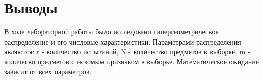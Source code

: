 \documentclass[a4paper,14pt]{extarticle}
\begin{document}
\section*{Выводы}
В ходе лабораторной работы было исследовано гипергеометрическое
распределение и его числовые характеристики. Параметрами
распределения являются: r - количество испытаний, N - количество
предметов в выборке, m - количесво предметов с искомым признаком
в выборке. Математическое ожидание зависит от всех параметров.
\end{document}
